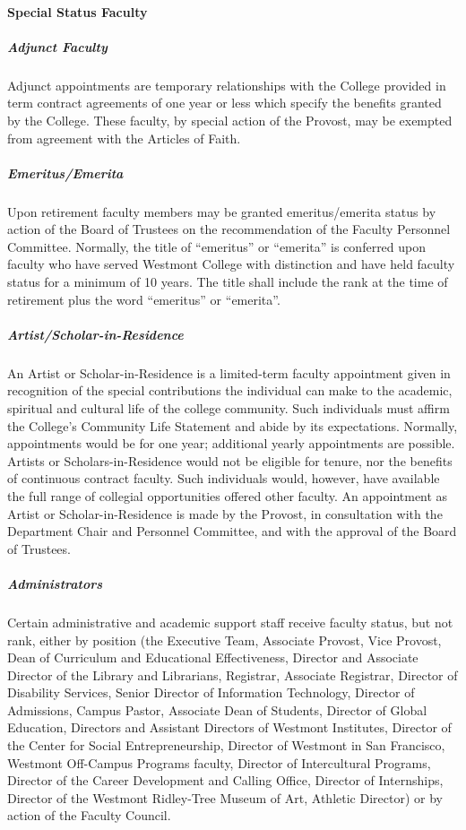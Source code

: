 			\paragraph{Special Status Faculty}
				\subparagraph{Adjunct Faculty}
					Adjunct appointments are temporary relationships with the College provided in term contract agreements of one year or less which specify the benefits granted by the College. These faculty, by special action of the Provost, may be exempted from agreement with the Articles of Faith.
				\subparagraph{Emeritus/Emerita}
					Upon retirement faculty members may be granted emeritus/emerita status by action of the Board of Trustees on the recommendation of the Faculty Personnel Committee.  Normally, the title of ``emeritus'' or ``emerita'' is conferred upon faculty who have served Westmont College with distinction and have held faculty status for a minimum of 10 years.  The title shall include the rank at the time of retirement plus the word ``emeritus'' or ``emerita''.
				\subparagraph{Artist/Scholar-in-Residence}
					An Artist or Scholar-in-Residence is a limited-term faculty appointment given in recognition of the special contributions the individual can make to the academic, spiritual and cultural life of the college community.  Such individuals must affirm the College's Community Life Statement and abide by its expectations.  Normally, appointments would be for one year; additional yearly appointments are possible.  Artists or Scholars-in-Residence would not be eligible for tenure, nor the benefits of continuous contract faculty. Such individuals would, however, have available the full range of collegial opportunities offered other faculty.  An appointment as Artist or Scholar-in-Residence is made by the Provost, in consultation with the Department Chair and Personnel Committee, and with the approval of the Board of Trustees.
				\subparagraph{Administrators}
					\label{sec:SpecialStatusFaculty-Administrators}
					Certain administrative and academic support staff receive faculty status, but not rank, either by position (the Executive Team, Associate Provost, Vice Provost, Dean of Curriculum and Educational Effectiveness, Director and Associate Director of the Library and Librarians, Registrar, Associate Registrar, Director of Disability Services, Senior Director of Information Technology, Director of Admissions, Campus Pastor, Associate Dean of Students, Director of Global Education, Directors and Assistant Directors of Westmont Institutes, Director of the Center for Social Entrepreneurship, Director of Westmont in San Francisco, Westmont Off-Campus Programs faculty, Director of Intercultural Programs, Director of the Career Development and Calling Office, Director of Internships, Director of the Westmont Ridley-Tree Museum of Art, Athletic Director) or by action of the Faculty Council.
